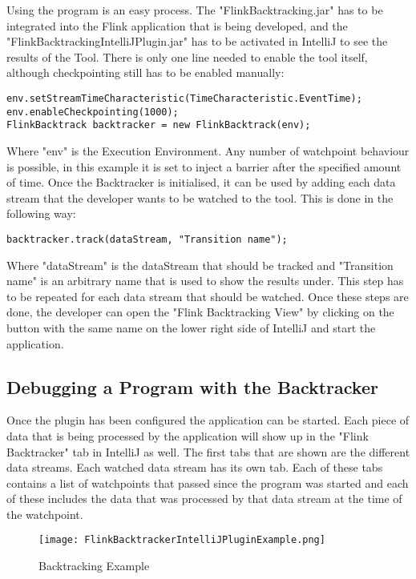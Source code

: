 Using the program is an easy process. The "FlinkBacktracking.jar" has to be integrated into the Flink application that is being developed, and the "FlinkBacktrackingIntelliJPlugin.jar" has to be activated in IntelliJ to see the results of the Tool. There is only one line needed to enable the tool itself, although checkpointing still has to be enabled manually:

\begin{lstlisting}[caption={How to use the Backtracker}]
env.setStreamTimeCharacteristic(TimeCharacteristic.EventTime);
env.enableCheckpointing(1000);
FlinkBacktrack backtracker = new FlinkBacktrack(env);
\end{lstlisting}

Where "env" is the Execution Environment. Any number of watchpoint behaviour is possible, in this example it is set to inject a barrier after the specified amount of time. Once the Backtracker is initialised, it can be used by adding each data stream that the developer wants to be watched to the tool. This is done in the following way:

\begin{lstlisting}
backtracker.track(dataStream, "Transition name");
\end{lstlisting}

Where "dataStream" is the dataStream that should be tracked and "Transition name" is an arbitrary name that is used to show the results under. This step has to be repeated for each data stream that should be watched. Once these steps are done, the developer can open the "Flink Backtracking View" by clicking on the button with the same name on the lower right side of IntelliJ and start the application.

\subsection{Debugging a Program with the Backtracker}
Once the plugin has been configured the application can be started. Each piece of data that is being processed by the application will show up in the "Flink Backtracker" tab in IntelliJ as well. The first tabs that are shown are the different data streams. Each watched data stream has its own tab. Each of these tabs contains a list of watchpoints that passed since the program was started and each of these includes the data that was processed by that data stream at the time of the watchpoint.

\begin{figure}[h!]
    \centering
      \texttt{[image: FlinkBacktrackerIntelliJPluginExample.png]}
      \caption{Backtracking Example}
      \label{flinkBacktrackingExample}
\end{figure}

